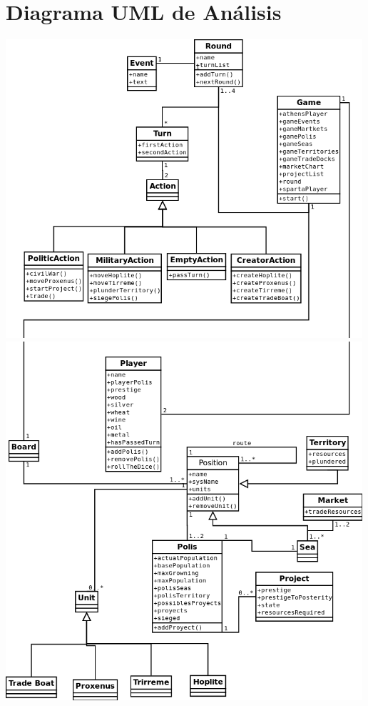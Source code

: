 \documentclass[11 pt]{book}
\begin{document}
\chapter{Diagrama UML de Análisis}
	\begin{center}
		\includegraphics[width=500px]{analysis-uml/analysis-uml-part1.png}
		\includegraphics[width=500px]{analysis-uml/analysis-uml-part2.png}
	\end{center}
	
\end{document}
